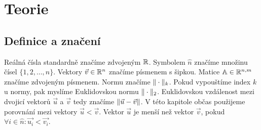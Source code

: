 \chapter{Teorie}

\section{Definice a značení}

Reálná čísla standardně značíme zdvojeným $\mathbb{R}$. Symbolem $\hat n$ značíme množinu čísel $\{1, 2, \ldots, n\}$. Vektory $\vec{v} \in \mathbb{R}^n$ značíme písmenem s šipkou. Matice $\mathbb{A} \in \mathbb{R}^{n, m}$ značíme zdvojeným písmenem. Normu značíme $\|\cdot\|_k$. Pokud vypouštíme index $k$ u normy, pak myslíme Euklidovskou normu $\|\cdot\|_2$. Euklidovskou vzdálenost mezi dvojicí vektorů $\vec{u}$ a $\vec{v}$ tedy značíme $\|\vec{u} - \vec{v}\|$. V této kapitole občas použijeme porovnání mezi vektory $\vec{u} < \vec{v}$. Vektor $\vec{u}$ je menší než vektor $\vec{v}$, pokud $\forall i \in \hat{n}: \vec{u_i} < \vec{v_i}$.





